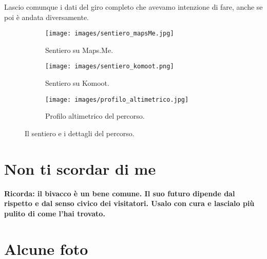 \documentclass{article}
\begin{document}
Lascio comunque i dati del giro completo che avevamo intenzione di fare, anche se poi è andata diversamente.

\begin{figure}[htbp!]
    \centering
    \begin{subfigure}[t]{0.45\textwidth}
        \centering
        \vspace{0pt} %
        \texttt{[image: images/sentiero\_mapsMe.jpg]}
        \caption{Sentiero su Maps.Me.}
        \label{fig:foto_lunga}
    \end{subfigure}
    \hfill
    \begin{subfigure}[t]{0.45\textwidth}
        \centering
        \vspace{0pt} %
        \texttt{[image: images/sentiero\_komoot.png]}
        \caption{Sentiero su Komoot.}
        \label{fig:foto_corta1}
        \vspace{1em} %
        \texttt{[image: images/profilo\_altimetrico.jpg]}
        \caption{Profilo altimetrico del percorso.}
        \label{fig:foto_corta2}
    \end{subfigure}
    \caption{Il sentiero e i dettagli del percorso.}
    \label{fig:panoramica_dettagli}
\end{figure}


\section{Non ti scordar di me}
\textbf{\textcolor{BurntOrange}{Ricorda: il bivacco è un bene comune. Il suo futuro dipende dal rispetto e dal senso civico dei visitatori. Usalo con cura e lascialo più pulito di come l'hai trovato.}}


\section{Alcune foto}
\end{document}
